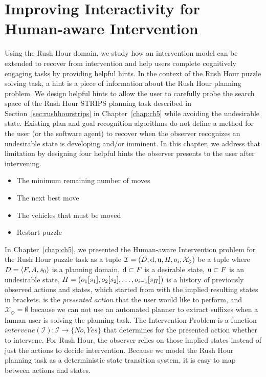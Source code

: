 \chapter{Improving Interactivity for Human-aware Intervention}
\label{chap:ch6}
Using the Rush Hour domain, we study how an intervention model can be extended to recover from intervention and help users complete cognitively engaging tasks by providing helpful hints. 
In the context of the Rush Hour puzzle solving task, a hint is a piece of information about the Rush Hour planning problem. 
We design helpful hints to allow the user to carefully probe the search space of the Rush Hour STRIPS planning task described in Section~\ref{sec:rushhourstrips} in
Chapter~\ref{chap:ch5} while avoiding the undesirable state.
Existing plan and goal recognition algorithms do not define a method for the user (or the software agent) to recover when the observer recognizes an undesirable state is developing and/or imminent.
In this chapter, we address that limitation by designing four helpful hints the observer presents to the user after intervening.
\begin{itemize}
\item The minimum remaining number of moves
\item The next best move
\item The vehicles that must be moved
\item Restart puzzle
\end{itemize}


In Chapter~\ref{chap:ch5}, we presented the Human-aware Intervention problem for the Rush Hour puzzle task as a tuple
$\mathcal{I} = (D, \mathrm{d}, \mathrm{u}, H, o_i, \mathcal{X}_\Diamond)$ be a tuple where
  $D=\langle F, A, s_0 \rangle$ is a planning domain,
  $\mathrm{d} \subset F$ is a desirable state,
  $\mathrm{u} \subset F$ is an undesirable state,
  $H = ( o_1 [s_1], o_2 [s_2], \ldots, o_{i-1} [s_{H}])$ is a history of previously observed actions and states, which started from \initialState with the implied resulting states in brackets.
  \presentedAction is the \emph{presented action} that the user would like to perform, and
  $\mathcal{X}_\Diamond = \emptyset$ because we can not use an automated planner to extract suffixes when a human user is solving the planning task.
The \textnormal{Intervention Problem} is a function $intervene (\mathcal{I}) :  \mathcal{I} \rightarrow \{No, Yes\} $
that determines for the presented action \presentedAction whether to intervene.
For Rush Hour, the observer relies on those implied states instead of just the actions to decide intervention.
Because we model the Rush Hour planning task as a deterministic state transition system,  it is easy to map between actions and states.


